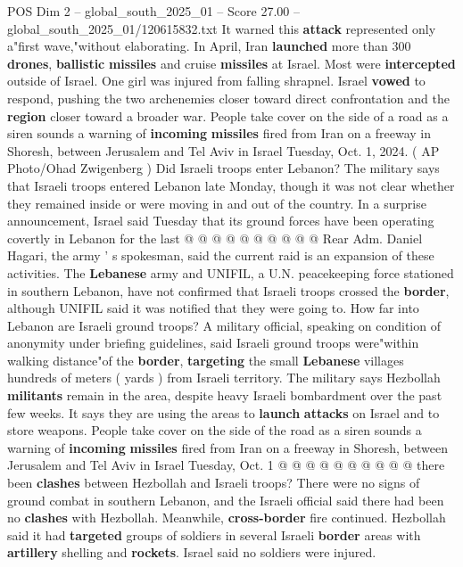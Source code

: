 \begin{textsample}{POS Dim 2 – global\_south\_2025\_01 – Score 27.00 – global\_south\_2025\_01/120615832.txt}
It warned this \textbf{attack} represented only a"first wave,"without elaborating.
In April, Iran \textbf{launched} more than 300 \textbf{drones}, \textbf{ballistic} \textbf{missiles} and cruise \textbf{missiles} at Israel.
Most were \textbf{intercepted} outside of Israel.
One girl was injured from falling shrapnel.
Israel \textbf{vowed} to respond, pushing the two archenemies closer toward direct confrontation and the \textbf{region} closer toward a broader war.
People take cover on the side of a road as a siren sounds a warning of \textbf{incoming} \textbf{missiles} fired from Iran on a freeway in Shoresh, between Jerusalem and Tel Aviv in Israel Tuesday, Oct. 1, 2024. ( AP Photo/Ohad Zwigenberg ) Did Israeli troops enter Lebanon?
The military says that Israeli troops entered Lebanon late Monday, though it was not clear whether they remained inside or were moving in and out of the country.
In a surprise announcement, Israel said Tuesday that its ground forces have been operating covertly in Lebanon for the last @ @ @ @ @ @ @ @ @ @ Rear Adm.
Daniel Hagari, the army ' s spokesman, said the current raid is an expansion of these activities.
The \textbf{Lebanese} army and UNIFIL, a U.N. peacekeeping force stationed in southern Lebanon, have not confirmed that Israeli troops crossed the \textbf{border}, although UNIFIL said it was notified that they were going to.
How far into Lebanon are Israeli ground troops?
A military official, speaking on condition of anonymity under briefing guidelines, said Israeli ground troops were"within walking distance"of the \textbf{border}, \textbf{targeting} the small \textbf{Lebanese} villages hundreds of meters ( yards ) from Israeli territory.
The military says Hezbollah \textbf{militants} remain in the area, despite heavy Israeli bombardment over the past few weeks.
It says they are using the areas to \textbf{launch} \textbf{attacks} on Israel and to store weapons.
People take cover on the side of the road as a siren sounds a warning of \textbf{incoming} \textbf{missiles} fired from Iran on a freeway in Shoresh, between Jerusalem and Tel Aviv in Israel Tuesday, Oct. 1 @ @ @ @ @ @ @ @ @ @ there been \textbf{clashes} between Hezbollah and Israeli troops?
There were no signs of ground combat in southern Lebanon, and the Israeli official said there had been no \textbf{clashes} with Hezbollah.
Meanwhile, \textbf{cross-border} fire continued.
Hezbollah said it had \textbf{targeted} groups of soldiers in several Israeli \textbf{border} areas with \textbf{artillery} shelling and \textbf{rockets}.
Israel said no soldiers were injured.

\end{textsample}
